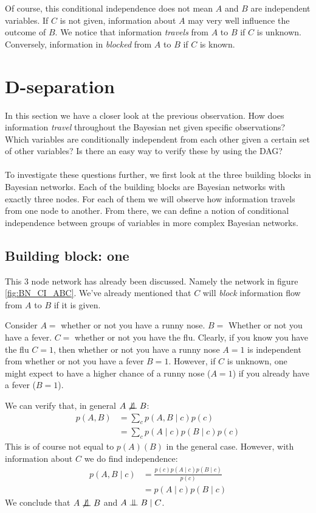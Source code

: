 \noindent
Of course, this conditional independence does not mean $A$ and $B$
are independent variables. If $C$ is not given, information about $A$
may very well influence the outcome of $B$. We notice that information
\textit{travels} from $A$ to $B$ if $C$ is unknown. Conversely, 
information in \textit{blocked} from $A$ to $B$ if $C$ is known.

\section{D-separation}
In this section we have a closer look at the previous observation.
How does information \textit{travel} throughout the Bayesian net
given specific observations? Which variables are conditionally 
independent from each other given a certain set of other variables?
Is there an easy way to verify these by using the DAG?
\\\\
To investigate these questions further, we first look at the 
three building blocks in Bayesian networks. Each of the building
blocks are Bayesian networks with exactly three nodes. For
each of them we will observe how information travels from one
node to another. From there, we can define a notion of conditional
independence between groups of variables in more complex Bayesian
networks.

\subsection{Building block: one}
This 3 node network has already been discussed. Namely the network 
in figure \ref{fig:BN_CI_ABC}. We've already mentioned that $C$
will \textit{block} information flow from $A$ to $B$ if it is given.
\begin{exmp}
Consider $A=$ whether or not you have a runny nose.
$B = $ Whether or not you have a fever. $C=$ whether or not you 
have the flu. Clearly, if you know you have the flu $C = 1$, then
whether or not you have a runny nose $A = 1$ is independent
from whether or not you have a fever $B = 1$. However, if $C$ is
unknown, one might expect to have a higher chance of a runny nose 
($A = 1$) if you already have a fever ($B = 1$).
\end{exmp}

\noindent
We can verify that, in general $A \not \CI B$:
\begin{equation}\begin{split}
p(A, B) 
	&= \sum_c p(A, B \mid c)p(c)\\
	&= \sum_c p(A \mid c)p(B \mid c)p(c)
\end{split}\end{equation}
This is of course not equal to $p(A)(B)$ in the general case. 
However, with information about $C$ we do find independence:
\begin{equation}\begin{split}
p(A, B \mid c) 
	&= \frac{p(c)p(A \mid c)p(B \mid c)}{p(c)} \\
	&= p(A \mid c) p(B \mid c)
\end{split}\end{equation}
We conclude that $A \not \CI B$ and $A \CI B \mid C$.
